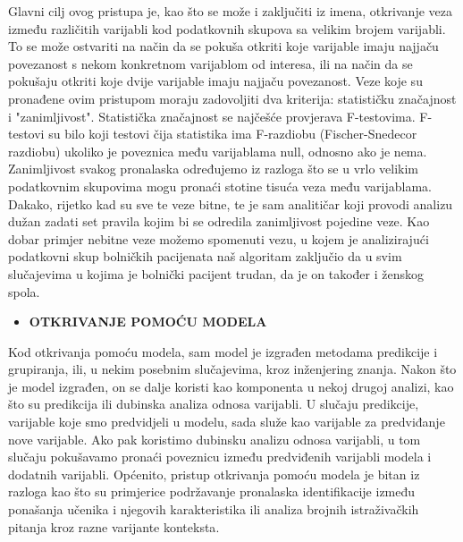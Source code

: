 \documentclass[times, utf8, zavrsni, numeric]{fer}
\begin{document}
Glavni cilj ovog pristupa je, kao što se može i zaključiti iz imena, otkrivanje veza između različitih varijabli kod podatkovnih skupova sa velikim brojem varijabli. To se može ostvariti na način da se pokuša otkriti koje varijable imaju najjaču povezanost s nekom konkretnom varijablom od interesa, ili na način da se pokušaju otkriti koje dvije varijable imaju najjaču povezanost. Veze koje su pronađene ovim pristupom moraju zadovoljiti dva kriterija: statističku značajnost i "zanimljivost". Statistička značajnost se najčešće provjerava F-testovima. F-testovi su bilo koji testovi  čija statistika ima F-razdiobu (Fischer-Snedecor razdiobu) ukoliko je poveznica među varijablama null, odnosno ako je nema. Zanimljivost svakog pronalaska određujemo iz razloga što se u vrlo velikim podatkovnim skupovima mogu pronaći stotine tisuća veza među varijablama. Dakako, rijetko kad su sve te veze bitne, te je sam analitičar koji provodi analizu dužan zadati set pravila kojim bi se odredila zanimljivost pojedine veze. Kao dobar primjer nebitne veze možemo spomenuti vezu, u kojem je analizirajući podatkovni skup bolničkih pacijenata naš algoritam zaključio da u svim slučajevima u kojima je bolnički pacijent trudan, da je on također i ženskog spola\cite{ungar2002uvod}.
\begin{itemize}
\item \textbf{OTKRIVANJE POMOĆU MODELA}
\end{itemize}
Kod otkrivanja pomoću modela, sam model je izgrađen metodama predikcije i grupiranja, ili, u nekim posebnim slučajevima, kroz inženjering znanja. Nakon što je model izgrađen, on se dalje koristi kao komponenta u nekoj drugoj analizi, kao što su predikcija ili dubinska analiza odnosa varijabli. U slučaju predikcije, varijable koje smo predvidjeli u modelu, sada služe kao varijable za predviđanje nove varijable. Ako pak koristimo dubinsku analizu odnosa varijabli, u tom slučaju pokušavamo pronaći poveznicu između predviđenih varijabli modela i dodatnih varijabli. Općenito, pristup otkrivanja pomoću modela je bitan iz razloga kao što su primjerice podržavanje pronalaska identifikacije između ponašanja učenika i njegovih karakteristika ili analiza brojnih istraživačkih pitanja kroz razne varijante konteksta\cite{edm2}.
\end{document}
